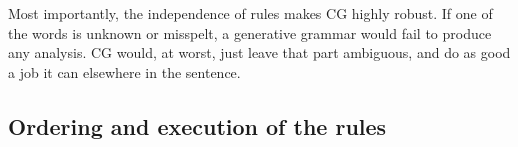 Most importantly, the independence of rules makes CG highly robust.
If one of the words is unknown or misspelt, a generative grammar would fail to produce any analysis. 
CG would, at worst, just leave that part ambiguous, and do as good a job it can elsewhere in the sentence.






\subsection{Ordering and execution of the rules}\label{sec:ordering}

